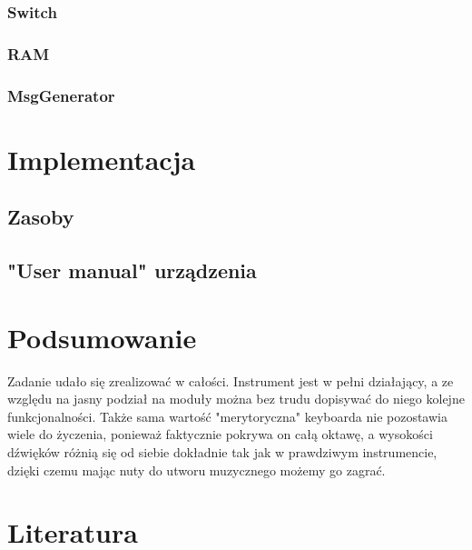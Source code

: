 \documentclass[a4paper,11pt]{article}
\begin{document}
\subsubsection{Switch}

\subsubsection{RAM}

\subsubsection{MsgGenerator}

\section{Implementacja}
\subsection{Zasoby}
\subsection{"User manual" urządzenia}

\section{Podsumowanie}
Zadanie udało się zrealizować w całości. Instrument jest w pełni działający, a ze względu na jasny podział na moduły można bez trudu dopisywać do niego kolejne funkcjonalności. Także sama wartość "merytoryczna" keyboarda nie pozostawia wiele do życzenia, ponieważ faktycznie pokrywa on całą oktawę, a wysokości dźwięków różnią się od siebie dokładnie tak jak w prawdziwym instrumencie, dzięki czemu mając nuty do utworu muzycznego możemy go zagrać.

\section{Literatura}
\end{document}

